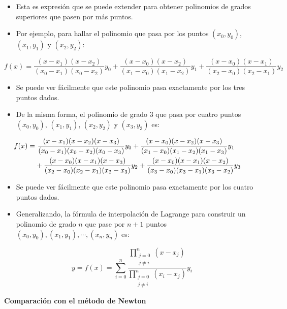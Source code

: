 \documentclass[openany]{book}
\providecommand{\tightlist}{%
  \setlength{\itemsep}{0pt}\setlength{\parskip}{0pt}}
\begin{document}
\begin{itemize}
\tightlist
\item
  Esta es expresión que se puede extender para obtener polinomios de grados superiores que pasen por más puntos.
\item
  Por ejemplo, para hallar el polinomio que pasa por los puntos \((x_0, y_0)\), \((x_1, y_1)\) y \((x_2, y_2)\):
\end{itemize}

\[
f(x) = \frac{(x - x_1)(x - x_2)}{(x_0 - x_1)(x_0 - x_2)} y_0 + \frac{(x - x_0)(x - x_2)}{(x_1 - x_0)(x_1 - x_2)} y_1 + \frac{(x - x_0)(x - x_1)}{(x_2 - x_0)(x_2 - x_1)} y_2
\]

\begin{itemize}
\item
  Se puede ver fácilmente que este polinomio pasa exactamente por los tres puntos dados.
\item
  De la misma forma, el polinomio de grado 3 que pasa por cuatro puntos \((x_0, y_0)\), \((x_1, y_1)\), \((x_2, y_2)\) y \((x_3, y_3)\) es:
\end{itemize}

\[
\hspace{-0.5cm}
\begin{split}
f(x) = &~ \frac{(x - x_1)(x - x_2)(x - x_3)}{(x_0 - x_1)(x_0 - x_2)(x_0 - x_3)} y_0 + \frac{(x - x_0)(x - x_2)(x - x_3)}{(x_1 - x_0)(x_1 - x_2)(x_1 - x_3)} y_1 \\
& + \frac{(x - x_0)(x - x_1)(x - x_3)}{(x_2 - x_0)(x_2 - x_1)(x_2 - x_3)} y_2 + \frac{(x - x_0)(x - x_1)(x - x_2)}{(x_3 - x_0)(x_3 - x_1)(x_3 - x_2)} y_3
\end{split}
\]

\begin{itemize}
\item
  Se puede ver fácilmente que este polinomio pasa exactamente por los cuatro puntos dados.
\item
  Generalizando, la fórmula de interpolación de Lagrange para construir un polinomio de grado \(n\) que pase por \(n+1\) puntos \((x_0, y_0), (x_1, y_1), \cdots, (x_n, y_n)\) es:
\end{itemize}

\[
y = f(x) = \sum_{i = 0}^n \frac{\prod\limits_{\substack{j = 0\\ j \neq i}}^n (x - x_j)}{\prod\limits_{\substack{j = 0\\ j \neq i}}^n (x_i - x_j)} y_i
\]

\textbf{Comparación con el método de Newton}
\end{document}
